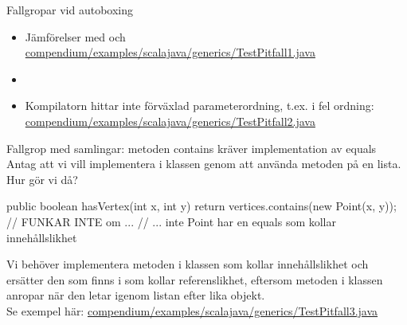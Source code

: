 \begin{Slide}{Fallgropar vid autoboxing}
\begin{itemize}
\item Jämförelser med \code{==} och \code{!=} \\
\href{https://github.com/lunduniversity/introprog/blob/master/compendium/examples/scalajava/generics/TestPitfall1.java}
{\SlideFontSmall  compendium/examples/scalajava/generics/TestPitfall1.java}
\item[]
\item Kompilatorn hittar inte förväxlad parameterordning, t.ex.  i fel ordning: \sout{}\\
\href{https://github.com/lunduniversity/introprog/blob/master/compendium/examples/scalajava/generics/TestPitfall2.java}
{\SlideFontSmall compendium/examples/scalajava/generics/TestPitfall2.java}
\end{itemize}
\end{Slide}

\begin{Slide}{Fallgrop med samlingar: metoden contains kräver implementation av equals}\SlideFontSmall
Antag att vi vill implementera  i klassen  genom att använda metoden  på en lista. Hur gör vi då?
\pause
\begin{Code}[numberstyle=,language=Java]
public boolean hasVertex(int x, int y) {
    return vertices.contains(new Point(x, y)); // FUNKAR INTE om ...
    // ... inte Point har en equals som kollar innehållslikhet
}
\end{Code}
Vi behöver implementera metoden  i klassen  som kollar innehållslikhet och ersätter den  som finns i  som kollar referenslikhet, eftersom metoden  i klassen  anropar  när den letar igenom listan efter lika objekt. \\
Se exempel här: \href{https://github.com/lunduniversity/introprog/tree/master/compendium/examples/scalajava/generics/TestPitfall3.java}{compendium/examples/scalajava/generics/TestPitfall3.java} \\


\end{Slide}



